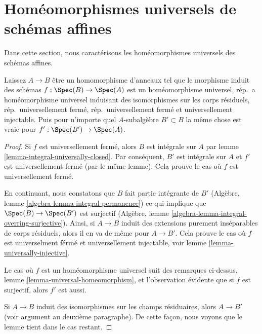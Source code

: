 \section{Homéomorphismes universels de schémas affines}
\label{section-universal-homeomorphisms-affine}

\noindent
Dans cette section, nous caractérisons les homéomorphismes universels des schémas affines.

\begin{lemma}

\label{lemma-subalgebra-inherits}
Laissez $A \to B$ être un homomorphisme d'anneaux tel que le morphisme induit des schémas $f : \Spec(B) \to \Spec(A)$ est un homéomorphisme universel, rép.\ a homéomorphisme universel induisant des isomorphismes sur les corps résiduels, rép.\ universellement fermé, rép.\ universellement fermé et universellement injectable. Puis pour n'importe quel $A$-subalgèbre $B' \subset B$ la même chose est vraie pour $f' : \Spec(B') \to \Spec(A)$.
\end{lemma}

\begin{proof}
Si $f$ est universellement fermé, alors $B$ est intégrale sur $A$ par lemme \ref{lemma-integral-universally-closed}. Par conséquent, $B'$ est intégrale sur $A$ et $f'$ est universellement fermé (par le même lemme). Cela prouve le cas où $f$ est universellement fermé.

\medskip\noindent
En continuant, nous constatons que $B$ fait partie intégrante de $B'$ (Algèbre, lemme \ref{algebra-lemma-integral-permanence}) ce qui implique que $\Spec(B) \to \Spec(B')$ est surjectif (Algèbre, lemme \ref{algebra-lemma-integral-overring-surjective}). Ainsi, si $A \to B$ induit des extensions purement inséparables de corps résiduels, alors il en va de même pour $A \to B'$. Cela prouve le cas où $f$ est universelment férmé et universellement injectable, voir lemme \ref{lemma-universally-injective}.

\medskip\noindent
Le cas où $f$ est un homéomorphisme universel suit des remarques ci-dessus, lemme \ref{lemma-universal-homeomorphism}, et l'observation évidente que si $f$ est surjectif, alors $f'$ est aussi.

\medskip\noindent

Si $A \to B$ induit des isomorphismes sur les champs résiduaires, alors $A \to B'$ (voir argument au deuxième paragraphe). De cette façon, nous voyons que le lemme tient dans le cas restant.

\end{proof}


